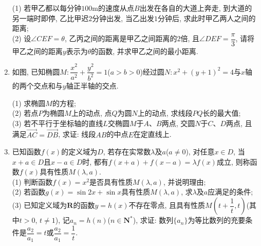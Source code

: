 \documentclass[10pt,a4paper]{article}
\begin{document}
\begin{enumerate}[1.]
\begin{center}
\end{center}
(1) 若甲乙都以每分钟$100\text{m}$的速度从点$B$出发在各自的大道上奔走, 到大道的另一端时即停, 乙比甲迟$2$分钟出发, 当乙出发$1$分钟后, 求此时甲乙两人之间的距离;\\
(2) 设$\angle CEF=\theta$, 乙丙之间的距离是甲乙之间距离的$2$倍, 且$\angle DEF=\dfrac\pi3$, 请将甲乙之间的距离$y$表示为$\theta$的函数, 并求甲乙之间的最小距离.
\item 如图, 已知椭圆$M:\dfrac{x^2}{a^2}+\dfrac{y^2}{b^2}=1$($a>b>0$)经过圆$N:x^2+(y+1)^2=4$与$x$轴的两个交点和与$y$轴正半轴的交点.\\
\begin{center}
\end{center}
(1) 求椭圆$M$的方程;\\
(2) 若点$P$为椭圆$M$上的动点, 点$Q$为圆$N$上的动点, 求线段$PQ$长的最大值;\\
(3) 若不平行于坐标轴的直线$L$交椭圆$M$于$A$、$B$两点, 交圆$N$于$C$、$D$两点, 且满足$\overrightarrow{AC}=\overrightarrow{DB}$, 求证: 线段$AB$的中点$E$在定直线上.
\item 已知函数$f(x)$的定义域为$D$, 若存在实常数$\lambda$及$a$($a\ne 0$), 对任意$x\in D$, 当$x+a\in D$且$x-a\in D$时, 都有$f(x+a)+f(x-a)=\lambda f(x)$成立, 则称函数$f(x)$具有性质$M(\lambda,a)$.\\
(1) 判断函数$f(x)=x^2$是否具有性质$M(\lambda,a)$, 并说明理由;\\
(2) 若函数$g(x)=\sin 2x+\sin x$具有性质$M(\lambda,a)$, 求$\lambda$及$a$应满足的条件;\\
(3) 已知定义域为$\mathbf{R}$的函数$y=h(x)$不存在零点, 且具有性质$M(t+\dfrac{1}{t},t)$(其中$t>0$, $t\ne 1$), 记$a_n=h(n)$($n\in \mathbf{N}^*$), 求证: 数列$\{a_n\}$为等比数列的充要条件是$\dfrac{a_2}{a_1}=t$或$\dfrac{a_2}{a_1}=\dfrac{1}{t}$.


\end{enumerate}
\end{document}
